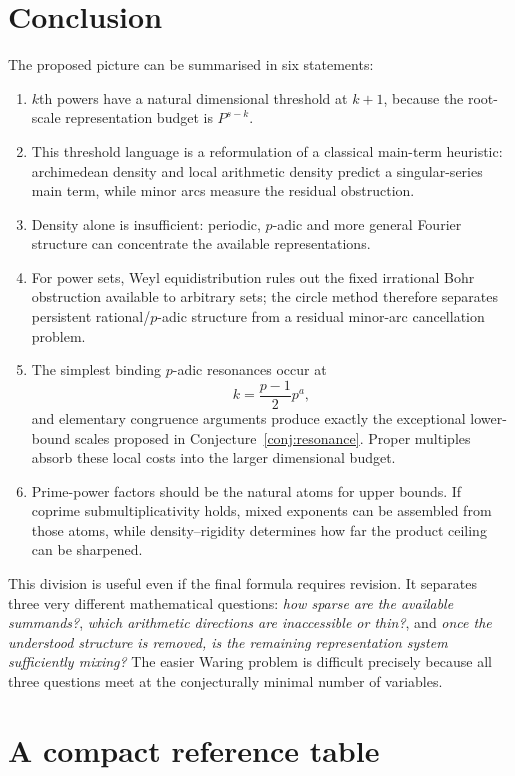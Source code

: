 \documentclass[../Axiomathic.tex]{subfiles}
\begin{document}
\section{Conclusion}

The proposed picture can be summarised in six statements:
\begin{enumerate}[label=\textbf{\arabic*.}]
\item $k$th powers have a natural dimensional threshold at $k+1$, because the root-scale representation budget is $P^{s-k}$.
\item This threshold language is a reformulation of a classical main-term heuristic: archimedean density and local arithmetic density predict a singular-series main term, while minor arcs measure the residual obstruction.
\item Density alone is insufficient: periodic, $p$-adic and more general Fourier structure can concentrate the available representations.
\item For power sets, Weyl equidistribution rules out the fixed irrational Bohr obstruction available to arbitrary sets; the circle method therefore separates persistent rational/$p$-adic structure from a residual minor-arc cancellation problem.
\item The simplest binding $p$-adic resonances occur at
\[
  k=\frac{p-1}{2}p^a,
\]
and elementary congruence arguments produce exactly the exceptional lower-bound scales proposed in Conjecture~\ref{conj:resonance}.  Proper multiples absorb these local costs into the larger dimensional budget.
\item Prime-power factors should be the natural atoms for upper bounds.  If coprime submultiplicativity holds, mixed exponents can be assembled from those atoms, while density--rigidity determines how far the product ceiling can be sharpened.
\end{enumerate}

This division is useful even if the final formula requires revision.  It separates three very different mathematical questions: \emph{how sparse are the available summands?}, \emph{which arithmetic directions are inaccessible or thin?}, and \emph{once the understood structure is removed, is the remaining representation system sufficiently mixing?}  The easier Waring problem is difficult precisely because all three questions meet at the conjecturally minimal number of variables.

\appendix
\section{A compact reference table}
\end{document}
